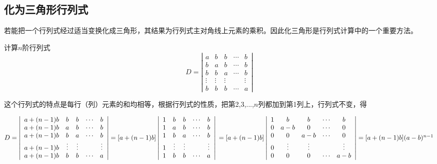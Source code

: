 \subsection{化为三角形行列式}

若能把一个行列式经过适当变换化成三角形，其结果为行列式主对角线上元素的乘积。因此化三角形是行列式计算中的一个重要方法。

\begin{example}
    计算$n$阶行列式
$$D=\left|\begin{array}{cccccc}
        a      & b      & b      & \cdots & b      \\
        b      & a      & b      & \cdots & b      \\
        b      & b      & a      & \cdots & b      \\
        \vdots & \vdots & \vdots &        & \vdots \\
        b      & b      & b      & \cdots & a
    \end{array}\right|$$
\end{example}

\begin{solution}
    这个行列式的特点是每行（列）元素的和均相等，根据行列式的性质，把第2,3,...,$n$列都加到第1列上，行列式不变，得

$D=\left|\begin{array}{cccccc}
        a+(n-1)b & b      & b      & \cdots & b      \\
        a+(n-1)b & a      & b      & \cdots & b      \\
        a+(n-1)b & b      & a      & \cdots & b      \\
        a+(n-1)b & \vdots & \vdots &        & \vdots \\
        a+(n-1)b & b      & b      & \cdots & a
    \end{array}\right|
    =[a+(n-1)b]\left|\begin{array}{cccccc}
        1 & b      & b      & \cdots & b      \\
        1 & a      & b      & \cdots & b      \\
        1 & b      & a      & \cdots & b      \\
        1 & \vdots & \vdots &        & \vdots \\
        1 & b      & b      & \cdots & a
    \end{array}\right| \\
    =[a+(n-1)b]\left|\begin{array}{cccccc}
        1 & b      & b      & \cdots & b      \\
        0 & a-b    & 0      & \cdots & 0      \\
        0 & 0      & a-b    & \cdots & 0      \\
        0 & \vdots & \vdots &        & \vdots \\
        0 & 0      & 0      & \cdots & a-b
    \end{array}\right|
    =[a+(n-1)b](a-b)^{n-1}
$
\end{solution}

